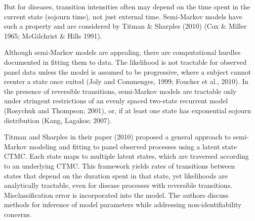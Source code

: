 \documentclass{uwstat572}
\begin{document}
But for diseases, transition intensities often may depend on the time spent in the current state (sojourn time), not just external time. Semi-Markov models have such a property and are considered by Titman \& Sharples (2010) (Cox \& Miller 1965; McGilchrist \& Hills 1991).

Although semi-Markov models are appealing, there are computational hurdles documented in fitting them to data. The likelihood is not tractable for observed panel data unless the model is assumed to be progressive, where a subject cannot reenter a state once exited (Joly and Commenges, 1999; Foucher et al., 2010). In the presence of reversible transitions, semi-Markov models are tractable only under stringent restrictions of an evenly spaced two-state recurrent model (Rosychuk and Thompson; 2001), or, if at least one state has exponential sojourn distribution (Kang, Lagakos; 2007).

Titman and Sharples in their paper (2010) proposed a general approach to semi-Markov modeling and fitting to panel observed processes using a latent state CTMC. Each state maps to multiple latent states, which are traversed according to an underlying CTMC. This framework yields rates of transitions between states that depend on the duration spent in that state, yet likelihoods are analytically tractable, even for disease processes with reversible transitions. Misclassification error is incorporated into the model. The authors discuss methods for inference of model parameters while addressing non-identifiability concerns.
\end{document}
